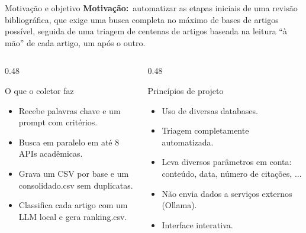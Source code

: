 \documentclass[aspectratio=169, 10pt]{beamer}
\newcommand{\rot}[2]{\textbf{\textcolor{#1}{#2}}}
\newcommand{\motiv}{\rot{accentgold}{Motivação:}\ }
\newcommand{\cod}[1]{{\ttfamily\color{radargreen}#1}}
\begin{document}
\begin{frame}[t]{Motivação e objetivo}
  \small
  \motiv automatizar as etapas iniciais de uma revisão bibliográfica, que exige uma busca completa no máximo de bases de artigos possível, seguida de uma triagem de centenas de artigos baseada na leitura ``à mão'' de cada artigo, um após o outro.

  \vspace{6pt}
  \begin{columns}[T,onlytextwidth]
    \begin{column}{0.48\textwidth}
      \begin{block}{O que o coletor faz}
        \footnotesize
        \begin{itemize}\setlength{\itemsep}{2pt}
          \item Recebe palavras chave e um prompt com critérios. 
          \item Busca em paralelo em até 8 APIs acadêmicas.
          \item Grava um CSV por base e um \cod{consolidado.csv} sem duplicatas.
          \item Classifica cada artigo com um LLM local e gera \cod{ranking.csv}.
        \end{itemize}
      \end{block}
    \end{column}
    \begin{column}{0.48\textwidth}
      \begin{exampleblock}{Princípios de projeto}
        \footnotesize
        \begin{itemize}\setlength{\itemsep}{2pt}
          \item Uso de diversas databases. 
          \item Triagem completamente automatizada.
          \item Leva diversos parâmetros em conta: conteúdo, data, número de citações, ...
          \item Não envia dados a serviços externos (Ollama).
          \item Interface interativa. 
        \end{itemize}
      \end{exampleblock}
    \end{column}
  \end{columns}
\end{frame}
\end{document}

